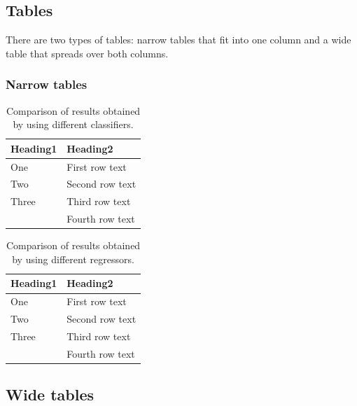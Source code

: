 \documentclass[10pt, a4paper]{article}
\begin{document}
\subsection{Tables}

There are two types of tables: narrow tables that fit into one column and a wide table that spreads over both columns.

\subsubsection{Narrow tables}


\begin{table}
\caption{Comparison of results obtained by using different classifiers.}
\label{tab:classifiers}
\begin{center}
\begin{tabular}{ll}
\toprule
Heading1 & Heading2 \\
\midrule
One & First row text \\
Two   & Second row text \\
Three   & Third row text \\
      & Fourth row text \\
\bottomrule
\end{tabular}
\end{center}
\end{table}

\begin{table}
	\caption{Comparison of results obtained by using different regressors.}
	\label{tab:regressors}
	\begin{center}
		\begin{tabular}{ll}
			\toprule
			Heading1 & Heading2 \\
			\midrule
			One & First row text \\
			Two   & Second row text \\
			Three   & Third row text \\
			& Fourth row text \\
			\bottomrule
		\end{tabular}
	\end{center}
\end{table}

\subsection{Wide tables}
\end{document}

